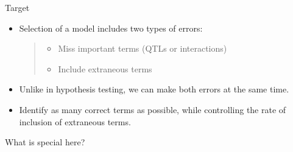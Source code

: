 \documentclass[12pt]{article}
\newcommand{\headsize}{\fontsize{35}{35} \selectfont}
\newcommand{\smallersize}{\fontsize{20}{25} \selectfont}
\newcommand{\smallestsize}{\fontsize{18}{22} \selectfont}
\begin{document}
\newpage

\headsize \color{myyellow}
\hfill \begin{minipage}{5.75in}
\centering
Target
\end{minipage}

\vspace{2cm} \color{mywhite} \smallersize

\hfill \begin{minipage}{10in}
\begin{itemize}
\itemsep24pt
\item Selection of a model includes two types of errors:

{\smallestsize
\begin{quote} \begin{itemize}
\item Miss important terms (QTLs or interactions)
\item Include extraneous terms
\end{itemize} \end{quote}}

\item Unlike in hypothesis testing, we can make {\color{mypink} both errors} at
the same time.

\item {\color{myyellow} Identify as many correct terms as possible, while
{\color{mypink} controlling the rate of inclusion of extraneous terms}.}

%
%


\end{itemize}
\end{minipage}


\newpage

\headsize \color{myyellow}
\hfill \begin{minipage}{5.75in}
\centering
What is special here?
\end{minipage}
\end{document}
